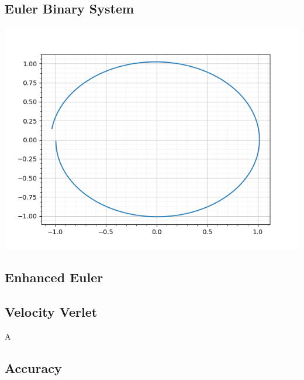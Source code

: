 \documentclass[12pt]{article}
\begin{document}
\subsection{Euler Binary System}

\includegraphics[scale=0.5]{binary_euler.png}
\subsection{Enhanced Euler}

\subsection{Velocity Verlet}A

\subsection{Accuracy}
\end{document}
